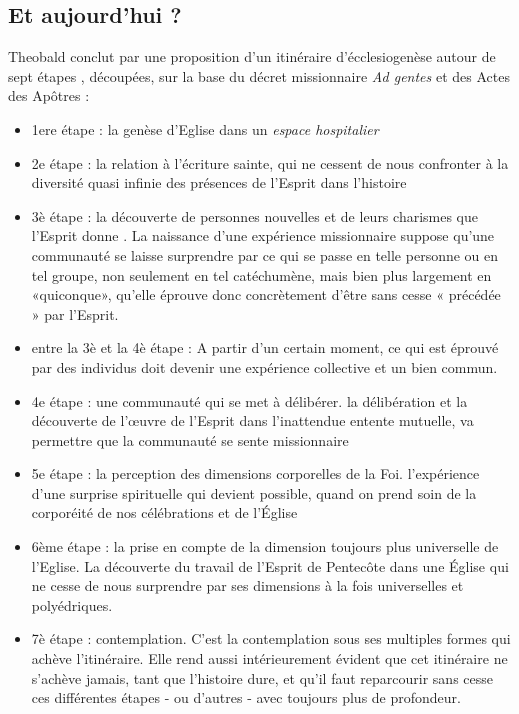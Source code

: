 \subsection{ Et aujourd'hui ?}
Theobald conclut par une proposition d'un itinéraire d'écclesiogenèse autour de   sept étapes , découpées, sur la base du décret missionnaire \textit{Ad gentes }et des Actes des Apôtres : 
\begin{itemize}
    \item  1ere étape : la genèse d'Eglise dans un \textit{espace hospitalier}
    \item 2e étape : la relation à l'écriture sainte,  qui ne cessent de nous confronter à la diversité quasi infinie des présences de l'Esprit dans l'histoire 
    \item 3è étape : la découverte de personnes nouvelles et de leurs charismes que l'Esprit donne . La naissance d'une expérience missionnaire suppose qu'une communauté se laisse surprendre par ce qui se passe en telle personne ou en tel groupe, non seulement en tel catéchumène, mais bien plus largement en «quiconque», qu'elle éprouve donc concrètement d'être sans cesse « précédée » par l'Esprit. 
    \item entre la 3è et la 4è étape : A partir d'un certain moment, ce qui est éprouvé par des individus doit devenir une expérience collective et un bien commun.  
 
\item 4e étape : une communauté qui se met à délibérer. la délibération et la découverte de l'œuvre de l'Esprit dans l'inattendue entente mutuelle, va permettre que la communauté se sente missionnaire

    \item 5e étape : la perception des dimensions corporelles de la Foi. l'expérience d'une surprise spirituelle qui devient possible, quand on prend soin de la corporéité de nos célébrations et de l'Église 
    \item 6ème étape : la prise en compte de la dimension toujours plus universelle de l'Eglise. La découverte du travail de l'Esprit de Pentecôte dans une Église qui ne cesse de nous surprendre par ses dimensions à la fois universelles et polyédriques. 
    \item 7è étape : contemplation. C'est la contemplation sous ses multiples formes qui achève l'itinéraire. Elle rend aussi intérieurement évident que cet itinéraire ne s'achève jamais, tant que l'histoire dure, et qu'il faut reparcourir sans cesse ces différentes étapes - ou d'autres - avec toujours plus de profondeur.\cite[p. 460]{theobald_urgences_2017}
\end{itemize}
   
